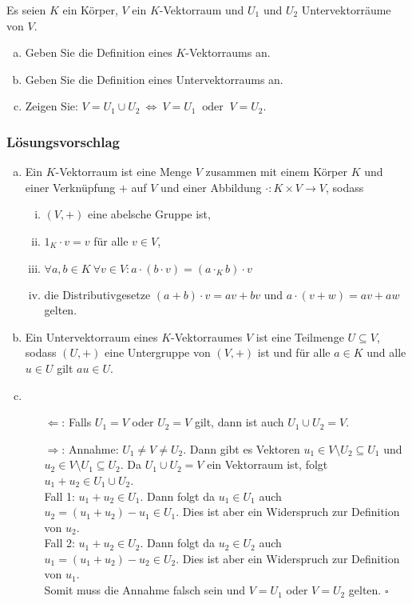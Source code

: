 \documentclass[a4paper,11pt]{scrartcl}
\newcounter{auf}
\begin{document}
Es seien $K$ ein Körper, $V$ ein $K$-Vektorraum und $U_1$ und $U_2$
Untervektorräume von $V.$

\begin{enumerate}[a)]
\item Geben Sie die Definition eines $K$-Vektorraums an.
\item Geben Sie die Definition eines Untervektorraums an.
\item Zeigen Sie: $V=U_1\cup U_2  \ \Longleftrightarrow \ V=U_1\ \text{ oder }\ V=U_2.$
\end{enumerate}
%
%
\subsubsection*{Lösungsvorschlag}
\begin{enumerate}[a)]
\item Ein $K$-Vektorraum ist eine Menge $V$ zusammen mit einem Körper $K$ und einer Verknüpfung $+$ auf $V$ und einer Abbildung $\cdot:K\times V \to V$, sodass
\begin{enumerate}[i)]
\item $(V,+)$ eine abelsche Gruppe ist,
\item $1_K\cdot v=v$ für alle $v\in V$,
\item $\forall a,b \in K \ \forall v \in V: a\cdot (b \cdot v)=(a\cdot_K b)\cdot v$
\item die Distributivgesetze $(a+b)\cdot v=av+bv$ und $a\cdot (v+w)=av+aw$ gelten.
\end{enumerate}
\item Ein Untervektorraum eines $K$-Vektorraumes $V$ ist eine Teilmenge $U \subseteq V$, sodass $(U,+)$ eine Untergruppe von $(V,+)$ ist und für alle $a\in K$ und alle $u\in U$ gilt $au \in U$.
\item 
\begin{itemize}
\item[$\Leftarrow$:] Falls $U_1=V$ oder $U_2=V$ gilt, dann ist auch $U_1\cup U_2=V$.
\item[$\Rightarrow$:] Annahme: $U_1\ne V \ne U_2$. Dann gibt es Vektoren $u_1 \in V\setminus U_2 \subseteq U_1$ und $u_2 \in V\setminus U_1 \subseteq U_2$. Da $U_1 \cup U_2=V$ ein Vektorraum ist, folgt $u_1+u_2 \in U_1\cup U_2$.\\
Fall 1: $u_1+u_2 \in U_1$. Dann folgt da $u_1 \in U_1$ auch $u_2=(u_1+u_2)-u_1 \in U_1$. Dies ist aber ein Widerspruch zur Definition von $u_2$.\\
Fall 2: $u_1+u_2 \in U_2$. Dann folgt da $u_2 \in U_2$ auch $u_1=(u_1+u_2)-u_2 \in U_2$. Dies ist aber ein Widerspruch zur Definition von $u_1$.\\
Somit muss die Annahme falsch sein und $V=U_1$ oder $V=U_2$ gelten. \hfill $\square$
\end{itemize}
\end{enumerate}
\end{document}
